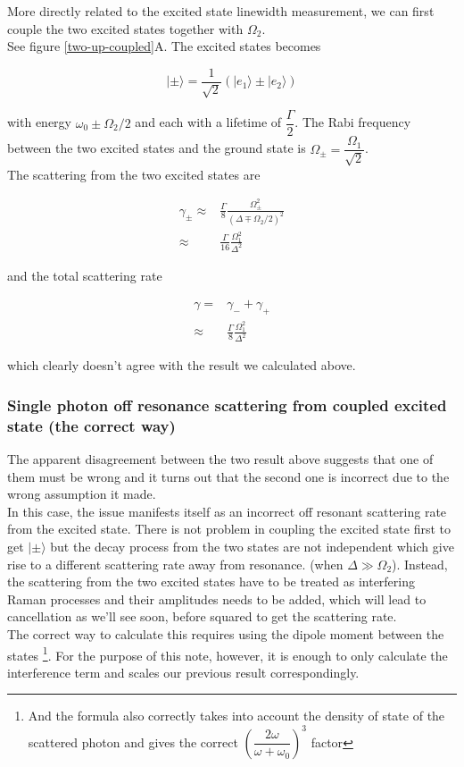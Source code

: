 \documentclass[10pt,fleqn]{article}
\newcommand{\eqar}[1]
{
  \begin{align*}
    #1
  \end{align*}
}
\newcommand{\paren}[1]{{\left({#1}\right)}}
\begin{document}
More directly related to the excited state linewidth measurement, we can first couple the
two excited states together with $\Omega_2$.\\

See figure \ref{two-up-coupled}A. The excited states becomes

\[|\pm\rangle=\frac{1}{\sqrt2}\paren{|e_1\rangle\pm|e_2\rangle}\]

with energy $\omega_0\pm\Omega_2/2$ and each with a lifetime of $\dfrac\Gamma2$.
The Rabi frequency between the two excited states and the ground state is
$\Omega_\pm=\dfrac{\Omega_1}{\sqrt2}$.\\
The scattering from the two excited states are
\eqar{
  \gamma_\pm\approx&\frac{\Gamma}{8}\frac{\Omega_\pm^2}{\paren{\Delta\mp\Omega_2/2}^2}\\
  \approx&\frac{\Gamma}{16}\frac{\Omega_1^2}{\Delta^2}
}
and the total scattering rate
\eqar{
  \gamma=&\gamma_-+\gamma_+\\
  \approx&\frac{\Gamma}{8}\frac{\Omega_1^2}{\Delta^2}
}
which clearly doesn't agree with the result we calculated above.

\subsubsection{Single photon off resonance scattering from coupled excited state
  (the correct way)}

The apparent disagreement between the two result above suggests that one of them must be wrong
and it turns out that the second one is incorrect due to the wrong assumption it made.\\

In this case, the issue manifests itself as an incorrect off resonant scattering rate
from the excited state. There is not problem in coupling the excited state first to get
$|\pm\rangle$ but the decay process from the two states are not independent which give rise
to a different scattering rate away from resonance. (when $\Delta\gg\Omega_2$).
Instead, the scattering from the two excited states have to be treated as interfering
Raman processes and their amplitudes needs to be added, which will lead to cancellation
as we'll see soon, before squared to get the scattering rate.\\

The correct way to calculate this requires using the dipole moment between the states
\footnote{And the formula also correctly takes into account the density of state of
  the scattered photon and gives the correct
  $\paren{\dfrac{2\omega}{\omega+\omega_0}}^3$ factor}.
For the purpose of this note, however, it is enough to only calculate the interference term
and scales our previous result correspondingly.\\
\end{document}
